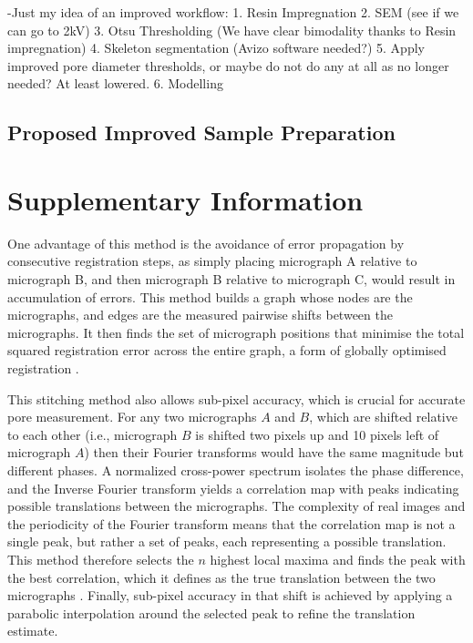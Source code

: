 \documentclass[review]{elsarticle}
\begin{document}
  -Just my idea of an improved workflow:
  1. Resin Impregnation
  2. SEM (see if we can go to 2kV)
  3. Otsu Thresholding (We have clear bimodality thanks to Resin impregnation)
  4. Skeleton segmentation (Avizo software needed?)
  5. Apply improved pore diameter thresholds, or maybe do not do any at all as no longer needed? At least lowered.
  6. Modelling

    \subsection{Proposed Improved Sample Preparation}



\section{Supplementary Information}

One advantage of this method is the avoidance of error propagation by
consecutive registration steps, as simply placing micrograph A relative to
micrograph B, and then micrograph B relative to micrograph C, would result in
accumulation of errors. This method builds a graph whose nodes are the
micrographs, and edges are the measured pairwise shifts between the micrographs.
It then finds the set of micrograph positions that minimise the total squared
registration error across the entire graph, a form of globally optimised
registration \citep{Preibisch2009}.

This stitching method also allows sub-pixel accuracy, which is crucial for
accurate pore measurement. For any two micrographs \(A\) and \(B\), which are
shifted relative to each other (i.e., micrograph \(B\) is shifted two pixels up
and 10 pixels left of micrograph \(A\)) then their Fourier transforms would
have the same magnitude but different phases. A normalized cross-power spectrum
isolates the phase difference, and the Inverse Fourier transform
yields a correlation map with peaks indicating possible translations between the
micrographs. The complexity of real images and the periodicity of the Fourier
transform means that the correlation map is not a single peak, but rather a set
of peaks, each representing a possible translation. This method therefore
selects the \(n\) highest local maxima and finds the peak with the best
correlation, which it defines as the true translation between the two
micrographs \citep{Preibisch2009}. Finally, sub-pixel accuracy in that shift is
achieved by applying a parabolic interpolation around the selected peak to
refine the translation estimate.
\end{document}
